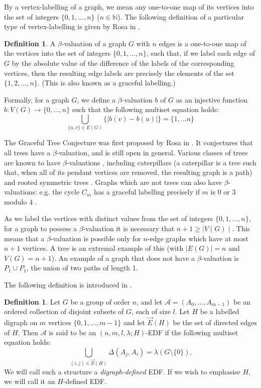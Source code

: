 \documentclass[12pt, a4paper]{article}
\theoremstyle{definition}
\newtheorem{definition}[theorem]{Definition}
\newcommand{\E}{\overrightarrow{E}}
\begin{document}
By a vertex-labelling of a graph, we mean any one-to-one map of its vertices into the set of integers $\{0,1,\ldots,n\}$ ($n \in \mathbb{N}$).
The following definition of a particular type of vertex-labelling is given by Rosa in \cite{Rosa}.

\begin{definition}
A $\beta$‐valuation of a graph $G$ with $n$ edges is a one‐to‐one map of the vertices into the set of integers $\{0,1,\ldots,n\}$, such that, if we label each edge of $G$ by the absolute value of the difference of the labels of the corresponding vertices, then the resulting edge labels are precisely the elements of the set $\{1,2,\ldots,n\}$. (This is also known as a graceful labelling.)

Formally, for a graph $G$, we define a $\beta$-valuation $b$ of $G$ as an injective function $b : V(G) \rightarrow \{0,\ldots,n\}$
such that the following multiset equation holds:
\[\bigcup_{\{u,v\}\in E(G)} \{ \mid b(v)-b(u) \mid \}= \{1, \ldots n\}\]
\end{definition}
The Graceful Tree Conjecture was first proposed by Rosa in \cite{Rosa}. It conjectures that all trees have a $\beta$-valuation, and is still open in general. Various classes of trees are known to have $\beta$-valuations \cite{Rosa}, including caterpillars (a caterpillar is a tree such that, when all of its pendant vertices are removed, the resulting graph is a path) and rooted symmetric trees \cite{Rob}.  Graphs which are not trees can also have $\beta$-valuations: e.g. the cycle $C_m$ has a graceful labelling precisely if $m$ is $0$ or $3$ modulo $4$ \cite{Rosa}.

As we label the vertices with distinct values from the set of integers $\{0,1,\ldots,n\}$, for a graph to possess a $\beta$-valuation it is necessary that $ n +1 \geq \mid V(G) \mid.$ This means that a $\beta$-valuation is possible only for $n$-edge graphs which have at most $n+1$ vertices. A tree is an extremal example of this (with $|E(G)|=n$ and $V(G)=n+1$). An example of a graph that does not have a $\beta$-valuation is $P_1 \cup P_1$, the union of two paths of length 1.


The following definition is introduced in \cite{HucJefMcC}.

\begin{definition}\label{def:H-defined EDF}
Let $G$ be a group of order $n$, and let $\mathcal{A}=(A_0,\ldots,A_{m-1})$ be an ordered collection of disjoint subsets of $G$, each of size $l$.  Let $H$ be a labelled digraph on $m$ vertices $\{0,1,\ldots,m-1\}$ and let $\E(H)$ be the set of directed edges of $H$.  Then $\mathcal{A}$ is said to be an $(n,m,l,\lambda; H)$-EDF if the following multiset equation holds:
$$ \bigcup_{(i,j) \in \E(H)} \Delta(A_j,A_i) = \lambda (G \setminus \{0\}).$$
We will call such a structure a \emph{digraph-defined} EDF.  If we wish to emphasise $H$, we will call it an $H$-defined EDF.
\end{definition}
\end{document}
